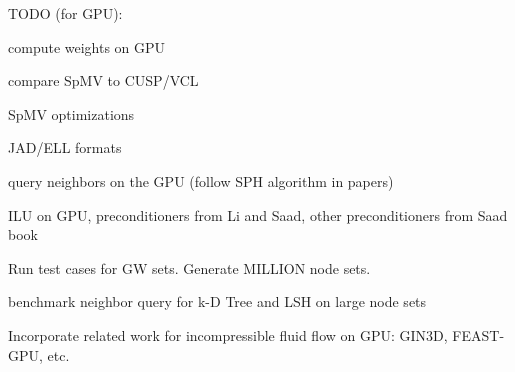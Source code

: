 TODO (for GPU): 
\begin{todolist} 
\item compute weights on GPU
\item compare SpMV to CUSP/VCL
\item SpMV optimizations
\item JAD/ELL formats 
\item query neighbors on the GPU (follow SPH algorithm in papers)
\item ILU on GPU, preconditioners from Li and Saad, other preconditioners from Saad book
\item Run test cases for GW sets. Generate MILLION node sets. 
\item benchmark neighbor query for k-D Tree and LSH on large node sets
\item Incorporate related work for incompressible fluid flow on GPU: GIN3D, FEAST-GPU, etc. 
\end{todolist} 
